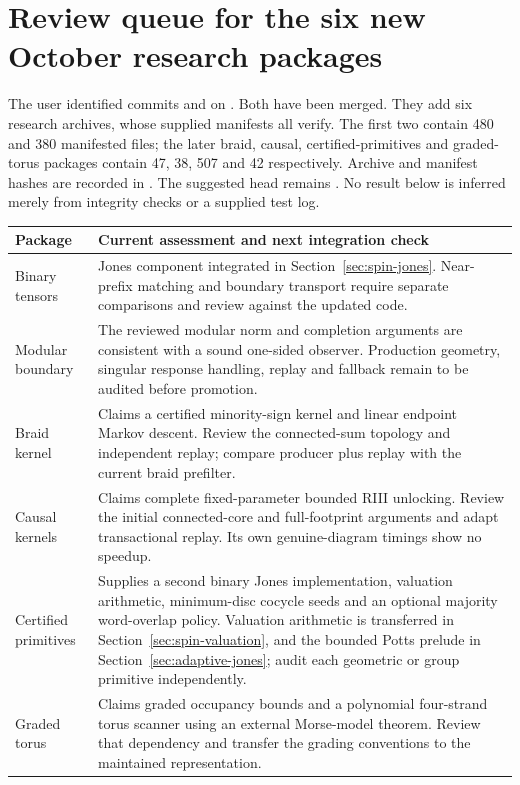 \section{Review queue for the six new October research packages}
\label{sec:incoming-oct8}

The user identified commits  and  on
. Both have been merged. They add six research archives,
whose supplied manifests all verify. The first two contain 480 and 380
manifested files; the later braid, causal, certified-primitives and graded-torus
packages contain 47, 38, 507 and 42 respectively. Archive and manifest hashes
are recorded in . The suggested
 head remains . No result below is inferred
merely from integrity checks or a supplied test log.

\begin{center}\small
\begin{tabularx}{\textwidth}{@{}p{}X@{}}
\toprule
Package & Current assessment and next integration check\\
\midrule
Binary tensors & Jones component integrated in Section~\ref{sec:spin-jones}.
Near-prefix matching and boundary transport require separate comparisons
and review against the updated code.\\
Modular boundary & The reviewed modular norm and completion arguments are
consistent with a sound one-sided observer. Production geometry, singular
response handling, replay and fallback remain to be audited before promotion.\\
Braid kernel & Claims a certified minority-sign kernel and linear endpoint
Markov descent. Review the connected-sum topology and independent replay;
compare producer plus replay with the current braid prefilter.\\
Causal kernels & Claims complete fixed-parameter bounded RIII unlocking.
Review the initial connected-core and full-footprint arguments and adapt
transactional replay. Its own genuine-diagram timings show no speedup.\\
Certified primitives & Supplies a second binary Jones implementation,
valuation arithmetic, minimum-disc cocycle seeds and an optional majority
word-overlap policy. Valuation arithmetic is transferred in
Section~\ref{sec:spin-valuation}, and the bounded Potts prelude in
Section~\ref{sec:adaptive-jones}; audit each geometric or group primitive independently.\\
Graded torus & Claims graded occupancy bounds and a polynomial four-strand
torus scanner using an external Morse-model theorem. Review that dependency
and transfer the grading conventions to the maintained representation.\\
\bottomrule
\end{tabularx}
\end{center}

